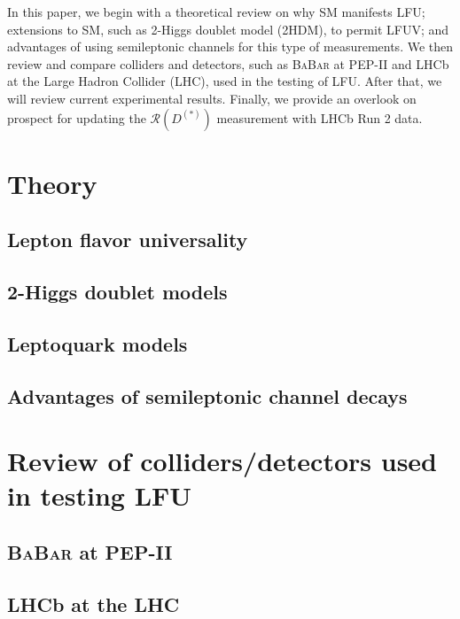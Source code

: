 \documentclass[12pt,letterpaper]{article}
\def\BaBar/{\textsc{BaBar}}
\def\RDDst/{\ensuremath{\mathcal{R}(D^{(*)})}}
\begin{document}
In this paper, we begin with a theoretical review on
why SM manifests LFU;
extensions to SM, such as 2-Higgs doublet model (2HDM), to permit LFUV;
and advantages of using semileptonic channels for this type of measurements.
We then review and compare colliders and detectors, such as \BaBar/ at PEP-II
and LHCb at the Large Hadron Collider (LHC), used in the testing of LFU.
After that, we will review current experimental results.
Finally, we provide an overlook on prospect for updating the $\RDDst/$ measurement with LHCb Run
2 data.

\section{Theory}
\subsection{Lepton flavor universality}


\subsection{2-Higgs doublet models}

\subsection{Leptoquark models}

\subsection{Advantages of semileptonic channel decays}

\section{Review of colliders/detectors used in testing LFU}
\subsection{\BaBar/ at PEP-II} \label{sec:babar}


\subsection{LHCb at the LHC} \label{sec:lhcb}

\end{document}
